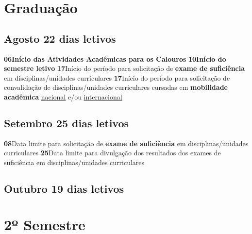 \documentclass[thesis]{hmcposter}
\begin{document}
\begin{poster}
\section{\color{hmcorange}Graduação}\subsection{Agosto \hfill 22 dias letivos}\textbf{06}\qquad \textbf{Início das Atividades Acadêmicas para os Calouros} \newline \null\textbf{10}\qquad \textbf{Início do semestre letivo} \newline \null\textbf{17}\qquad Início do período para solicitação de \textbf{exame de suficiência} em disciplinas/unidades curriculares \newline \null\textbf{17}\qquad Início do período para solicitação de convalidação de disciplinas/unidades curriculares cursadas em \textbf{mobilidade acadêmica} \underline{nacional} e/ou \underline{internacional} \newline \null\subsection{Setembro \hfill 25 dias letivos}\textbf{08}\qquad Data limite para solicitação de \textbf{exame de suficiência} em disciplinas/unidades curriculares \newline \null\textbf{25}\qquad Data limite para divulgação dos resultados dos exames de suficiência em disciplinas/unidades curriculares \newline \null\subsection{Outubro \hfill 19 dias letivos}\vfill\null
\columnbreak
\section{\hfill \color{hmcorange}2º Semestre}

\end{poster}
\end{document}
